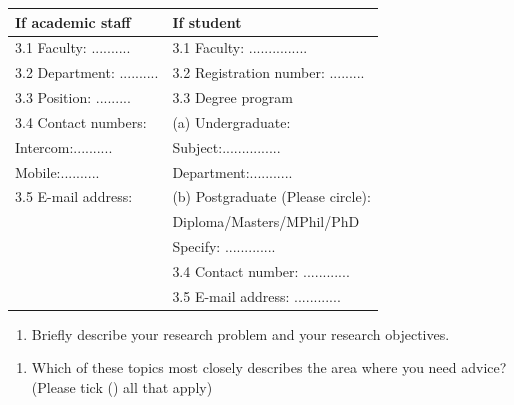 \documentclass[
  a4paper]{article}
\providecommand{\tightlist}{%
  \setlength{\itemsep}{0pt}\setlength{\parskip}{0pt}}
\begin{document}
\begin{table}[!h]
\center
\begin{tabular}{p{7cm}|p{7.5cm}}
\hline
If academic staff & If student \\ \hline
3.1 Faculty: .......... & 3.1 Faculty: ...............  \\ 
3.2 Department: .......... & 3.2 Registration number: ......... \\ 
3.3 Position: ......... & 3.3 Degree program \\ 
3.4 Contact numbers: & \hspace{0.5cm} (a) Undergraduate: \\ 
\hspace{0.8cm} Intercom:.......... & \hspace{0.8cm} Subject:............... \\ 
\hspace{0.8cm} Mobile:.......... & \hspace{0.8cm} Department:........... \\ 
3.5 E-mail address:  & \hspace{0.5cm} (b) Postgraduate (Please circle): \\ 
 & \hspace{0.8cm} Diploma/Masters/MPhil/PhD \\ 
 & \hspace{0.8cm} Specify: ............. \\ 
  & 3.4 Contact number: ............  \\ 
  & 3.5 E-mail address: ............  \\ \hline
\end{tabular}
\end{table}

\begin{enumerate}
\def\labelenumi{\arabic{enumi}.}
\setcounter{enumi}{3}
\tightlist
\item
  Briefly describe your research problem and your research objectives.
\end{enumerate}

\newpage

\begin{enumerate}
\def\labelenumi{\arabic{enumi}.}
\setcounter{enumi}{4}
\tightlist
\item
  Which of these topics most closely describes the area where you need
  advice? (Please tick (\checkmark) all that apply)
\end{enumerate}
\end{document}
